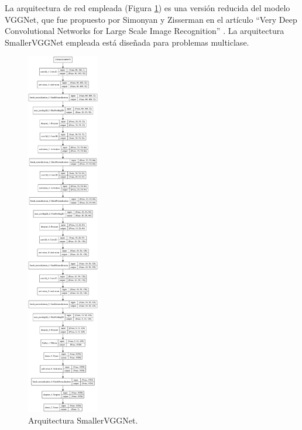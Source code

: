 La arquitectura de red empleada \cite{smallerVggNet} (Figura \ref{fig.SmallerVGGNet}) es una versión reducida del modelo VGGNet, que fue propuesto por Simonyan y Zisserman en el artículo ``Very Deep Convolutional Networks for Large Scale Image Recognition'' \cite{vgg}. La arquitectura SmallerVGGNet empleada está diseñada para problemas multiclase. \\

\begin{figure}
\begin{center}
	\includegraphics[width=0.28\textwidth]{figures/Clasificacion/model_smallervgg.png}
   \caption{Arquitectura SmallerVGGNet.}
	\label{fig.SmallerVGGNet}
\end{center}
\end{figure}

